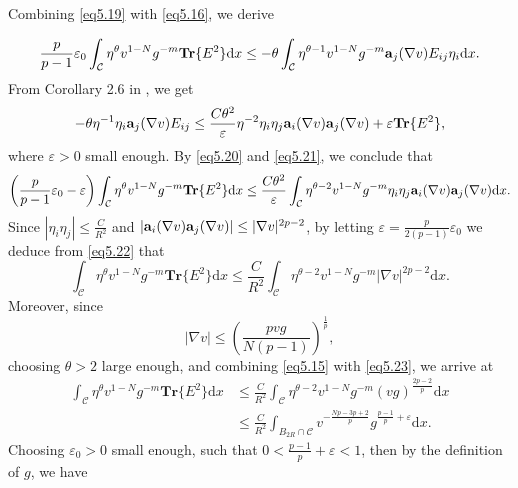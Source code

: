 \documentclass[12pt]{amsart}
\theoremstyle{definition}
\theoremstyle{remark}
\theoremstyle{conclusion}
\theoremstyle{conjecture}
\numberwithin{equation}{section}
\begin{document}
Combining \eqref{eq5.19} with \eqref{eq5.16}, we derive

\begin{equation}\label{eq5.20}
 \frac{p}{p-1}\varepsilon_0\int_{\mathcal{C}}\eta^\theta v^{1-N}g^{-m} \mathbf{Tr}\{E^2\}\mathrm{d}x\leq-\theta\int_{\mathcal{C}} \eta^{\theta-1} v^{1-N}g^{-m}{\bf{a}}_j(\nabla v)E_{ij}\eta_i\mathrm{d}x .
\end{equation}
From Corollary 2.6 in \cite{Ou}, we get
\begin{equation}\label{eq5.21}
-\theta\eta^{-1}\eta_i{\bf{a}}_j(\nabla v)E_{ij} \leq \frac{C\theta^2}{\varepsilon}\eta^{-2}\eta_i\eta_j{\bf{a}}_i(\nabla v){\bf{a}}_j(\nabla v)+ \varepsilon \mathbf{Tr}\{E^2\},
\end{equation}
where $\varepsilon>0$ small enough. By \eqref{eq5.20} and \eqref{eq5.21}, we conclude that
\begin{equation}\label{eq5.22}
\left(\frac{p}{p-1}\varepsilon_0-\varepsilon\right)\int_{\mathcal{C}}\eta^\theta v^{1-N}g^{-m} \mathbf{Tr}\{E^2\}\mathrm{d}x
\leq \frac{C\theta^2}{\varepsilon}\int_{\mathcal{C}} \eta^{\theta-2} v^{1-N}g^{-m}\eta_i\eta_j{\bf{a}}_i(\nabla v){\bf{a}}_j(\nabla v)\mathrm{d}x .
\end{equation}
Since $|\eta_i\eta_j|\leq \frac{C}{R^2}$ and $|{\bf{a}}_i(\nabla v){\bf{a}}_j(\nabla v)|\leq |\nabla v|^{2p-2}$,
by letting $\varepsilon= \frac{p}{2(p-1)}\varepsilon_0$  we deduce from \eqref{eq5.22} that
\begin{equation}\label{eq5.23}
\int_{\mathcal{C}}\eta^\theta v^{1-N}g^{-m} \mathbf{Tr}\{E^2\}\mathrm{d}x\leq \frac{C}{R^2}\int_{\mathcal{C}} \eta^{\theta-2} v^{1-N}g^{-m}|\nabla v|^{2p-2}\mathrm{d}x.
\end{equation}
Moreover, since
$$|\nabla v|\leq \left(\frac{pvg}{N(p-1)}\right) ^{\frac{1}{p}},$$
choosing $\theta>2$ large enough, and combining \eqref{eq5.15} with \eqref{eq5.23}, we arrive at
\begin{equation*}
  \begin{aligned}
   \int_{\mathcal{C}}\eta^\theta v^{1-N}g^{-m} \mathbf{Tr}\{E^2\}\mathrm{d}x&\leq \frac{C}{R^2}\int_{\mathcal{C}} \eta^{\theta-2} v^{1-N}g^{-m}(vg)^{\frac{2p-2}{p}}\mathrm{d}x \\
   &\leq \frac{C}{R^2}\int_{B_{2R}\cap\mathcal{C}}  v^{-\frac{Np-3p+2}{p}}g^{\frac{p-1}{p}+\varepsilon}\mathrm{d}x.
  \end{aligned}
\end{equation*}
Choosing $\varepsilon_0>0$ small enough, such that $0<\frac{p-1}{p}+\varepsilon<1$, then by the definition of $g$, we have
\end{document}
